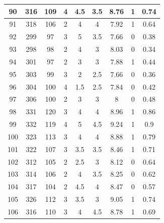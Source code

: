 \documentclass[11pt]{article}
\begin{document}
\begin{appendix}
\begin{longtable}[H]{|c|c|c|c|c|c|c|c|c|}
	90         & 316       & 109         & 4                 & 4.5 & 3.5 & 8.76 & 1        & 0.74            \\ \hline
	91         & 318       & 106         & 2                 & 4   & 4   & 7.92 & 1        & 0.64            \\ \hline
	92         & 299       & 97          & 3                 & 5   & 3.5 & 7.66 & 0        & 0.38            \\ \hline
	93         & 298       & 98          & 2                 & 4   & 3   & 8.03 & 0        & 0.34            \\ \hline
	94         & 301       & 97          & 2                 & 3   & 3   & 7.88 & 1        & 0.44            \\ \hline
	95         & 303       & 99          & 3                 & 2   & 2.5 & 7.66 & 0        & 0.36            \\ \hline
	96         & 304       & 100         & 4                 & 1.5 & 2.5 & 7.84 & 0        & 0.42            \\ \hline
	97         & 306       & 100         & 2                 & 3   & 3   & 8    & 0        & 0.48            \\ \hline
	98         & 331       & 120         & 3                 & 4   & 4   & 8.96 & 1        & 0.86            \\ \hline
	99         & 332       & 119         & 4                 & 5   & 4.5 & 9.24 & 1        & 0.9             \\ \hline
	100        & 323       & 113         & 3                 & 4   & 4   & 8.88 & 1        & 0.79            \\ \hline
	101        & 322       & 107         & 3                 & 3.5 & 3.5 & 8.46 & 1        & 0.71            \\ \hline
	102        & 312       & 105         & 2                 & 2.5 & 3   & 8.12 & 0        & 0.64            \\ \hline
	103        & 314       & 106         & 2                 & 4   & 3.5 & 8.25 & 0        & 0.62            \\ \hline
	104        & 317       & 104         & 2                 & 4.5 & 4   & 8.47 & 0        & 0.57            \\ \hline
	105        & 326       & 112         & 3                 & 3.5 & 3   & 9.05 & 1        & 0.74            \\ \hline
	106        & 316       & 110         & 3                 & 4   & 4.5 & 8.78 & 1        & 0.69            \\ \hline

\end{longtable}
\end{appendix}
\end{document}
